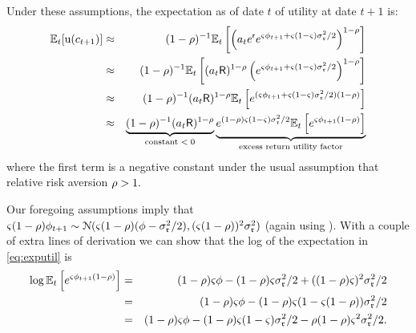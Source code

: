 Under these assumptions, the expectation as of date $t$ of utility at date $t+1$
is:
\begin{eqnarray}
  \mathbb{E}_{t}[{\mathrm{u}}(c_{t+1})] & \approx & (1-\rho)^{-1}\mathbb{E}_{t}\left[\left(a_{t}e^{\mathsf{r}}e^{{\varsigma} \phi_{t+1}+{\varsigma}(1-{\varsigma})\sigma^{2}_{\mathfrak{r}}/2 }\right)^{1-\rho}\right] \notag
\\                      & \approx & (1-\rho)^{-1}\mathbb{E}_{t}\left[(a_{t}\mathsf{R})^{1-\rho}\left( e^{{\varsigma} \phi_{t+1}+{\varsigma}(1-{\varsigma})\sigma^{2}_{\mathfrak{r}}/2 }\right)^{1-\rho}\right] \notag
\\                      & \approx & (1-\rho)^{-1}(a_{t}\mathsf{R})^{1-\rho}\mathbb{E}_{t}\left[e^{({\varsigma} \phi_{t+1}+{\varsigma}(1-{\varsigma})\sigma^{2}_{\mathfrak{r}}/2)  (1-\rho)}\right] \notag
\\                      & \approx & \underbrace{(1-\rho)^{-1}(a_{t}\mathsf{R})^{1-\rho}}_{\text{constant $< 0$}}\underbrace{e^{ (1-\rho){\varsigma}(1-{\varsigma})\sigma^{2}_{\mathfrak{r}}/2}\mathbb{E}_{t}\left[e^{{\varsigma} \phi_{t+1}  (1-\rho)}\right]}_{\text{excess return utility factor}}
 \label{eq:exputil}
  \end{eqnarray}
where the first term is a negative constant under the usual assumption that relative risk aversion $\rho>1.$

  Our foregoing assumptions imply that ${\varsigma} (1-\rho) \phi_{t+1}
   \sim \mathcal{N}({\varsigma} (1-\rho)(\phi -
  \sigma_{\mathfrak{r}}^{2}/2),({\varsigma}(1-\rho))^{2}\sigma_{\mathfrak{r}}^{2})$ (again using
  ).  With a couple of extra
  lines of derivation we can show that the log of the expectation in \eqref{eq:exputil} is
\begin{eqnarray}
  \log \mathbb{E}_{t}\left[e^{{\varsigma} \phi_{t+1}  (1-\rho)}\right] & = & {(1-\rho){\varsigma} \phi-(1-\rho){\varsigma}\sigma_{\mathfrak{r}}^{2}/2+ ((1-\rho){\varsigma})^{2}\sigma_{\mathfrak{r}}^{2}/2} \notag
\\  & = & {(1-\rho){\varsigma} \phi-(1-\rho){\varsigma}(1-{\varsigma}(1-\rho))\sigma_{\mathfrak{r}}^{2}/2} \notag
\\  & = & {(1-\rho){\varsigma} \phi-(1-\rho){\varsigma}(1-{\varsigma})\sigma_{\mathfrak{r}}^{2}/2-\rho (1-\rho){\varsigma}^{2}\sigma_{\mathfrak{r}}^{2}/2}. \label{eq:Ex}
\end{eqnarray}

